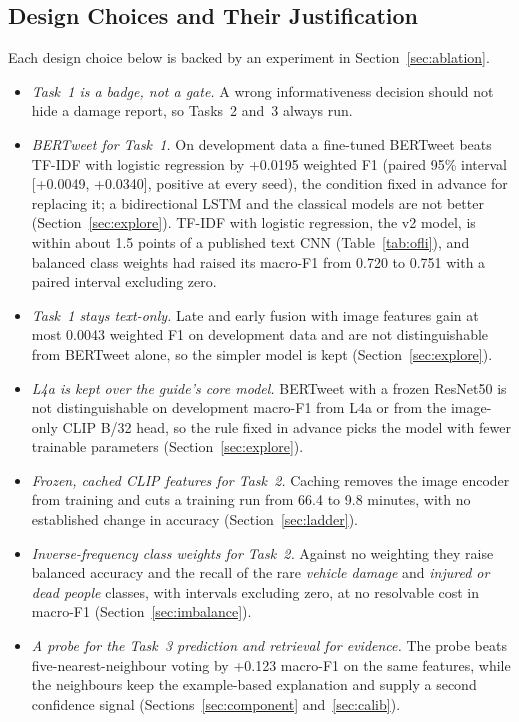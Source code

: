 \documentclass[conference]{IEEEtran}
\begin{document}
\subsection{Design Choices and Their Justification}
Each design choice below is backed by an experiment in Section~\ref{sec:ablation}.
\begin{itemize}
\item \emph{Task~1 is a badge, not a gate.} A wrong informativeness decision should not hide a damage report, so Tasks~2 and~3 always run.
\item \emph{BERTweet for Task~1.} On development data a fine-tuned BERTweet beats TF-IDF with logistic regression by +0.0195 weighted F1 (paired 95\% interval [+0.0049, +0.0340], positive at every seed), the condition fixed in advance for replacing it; a bidirectional LSTM and the classical models are not better (Section~\ref{sec:explore}). TF-IDF with logistic regression, the v2 model, is within about 1.5 points of a published text CNN (Table~\ref{tab:ofli}), and balanced class weights had raised its macro-F1 from 0.720 to 0.751 with a paired interval excluding zero.
\item \emph{Task~1 stays text-only.} Late and early fusion with image features gain at most 0.0043 weighted F1 on development data and are not distinguishable from BERTweet alone, so the simpler model is kept (Section~\ref{sec:explore}).
\item \emph{L4a is kept over the guide's core model.} BERTweet with a frozen ResNet50 is not distinguishable on development macro-F1 from L4a or from the image-only CLIP B/32 head, so the rule fixed in advance picks the model with fewer trainable parameters (Section~\ref{sec:explore}).
\item \emph{Frozen, cached CLIP features for Task~2.} Caching removes the image encoder from training and cuts a training run from 66.4 to 9.8 minutes, with no established change in accuracy (Section~\ref{sec:ladder}).
\item \emph{Inverse-frequency class weights for Task~2.} Against no weighting they raise balanced accuracy and the recall of the rare \emph{vehicle damage} and \emph{injured or dead people} classes, with intervals excluding zero, at no resolvable cost in macro-F1 (Section~\ref{sec:imbalance}).
\item \emph{A probe for the Task~3 prediction and retrieval for evidence.} The probe beats five-nearest-neighbour voting by +0.123 macro-F1 on the same features, while the neighbours keep the example-based explanation and supply a second confidence signal (Sections~\ref{sec:component} and~\ref{sec:calib}).
\end{itemize}
\end{document}
